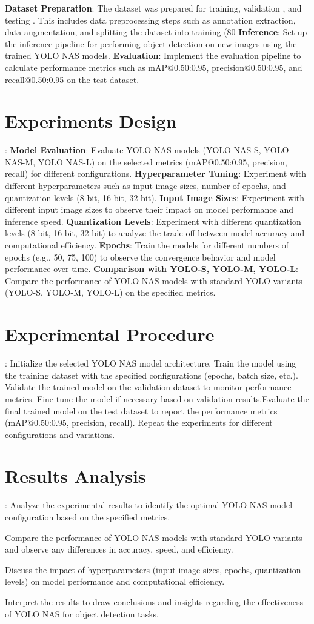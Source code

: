 \textbf{Dataset Preparation}: The dataset was prepared for training, validation , and testing . This includes data preprocessing steps such as annotation extraction, data augmentation, and splitting the dataset into training (80%
\textbf{Inference}: Set up the inference pipeline for performing object detection on new images using the trained YOLO NAS models.
\textbf{Evaluation}: Implement the evaluation pipeline to calculate performance metrics such as mAP@0.50:0.95, precision@0.50:0.95, and recall@0.50:0.95 on the test dataset.

\section{Experiments Design}:
\textbf{Model Evaluation}: Evaluate YOLO NAS models (YOLO NAS-S, YOLO NAS-M, YOLO NAS-L) on the selected metrics (mAP@0.50:0.95, precision, recall) for different configurations.
\textbf{Hyperparameter Tuning}: Experiment with different hyperparameters such as input image sizes, number of epochs, and quantization levels (8-bit, 16-bit, 32-bit).
\textbf{Input Image Sizes}: Experiment with different input image sizes to observe their impact on model performance and inference speed.
\textbf{Quantization Levels}: Experiment with different quantization levels (8-bit, 16-bit, 32-bit) to analyze the trade-off between model accuracy and computational efficiency.
\textbf{Epochs}: Train the models for different numbers of epochs (e.g., 50, 75, 100) to observe the convergence behavior and model performance over time.
\textbf{Comparison with YOLO-S, YOLO-M, YOLO-L}: Compare the performance of YOLO NAS models with standard YOLO variants (YOLO-S, YOLO-M, YOLO-L) on the specified metrics.

\section{Experimental Procedure}:
Initialize the selected YOLO NAS model architecture.
Train the model using the training dataset with the specified configurations (epochs, batch size, etc.). Validate the trained model on the validation dataset to monitor performance metrics. Fine-tune the model if necessary based on validation results.Evaluate the final trained model on the test dataset to report the performance metrics (mAP@0.50:0.95, precision, recall).
Repeat the experiments for different configurations and variations.

\section{Results Analysis}:
Analyze the experimental results to identify the optimal YOLO NAS model configuration based on the specified metrics.

Compare the performance of YOLO NAS models with standard YOLO variants and observe any differences in accuracy, speed, and efficiency.

Discuss the impact of hyperparameters (input image sizes, epochs, quantization levels) on model performance and computational efficiency.

Interpret the results to draw conclusions and insights regarding the effectiveness of YOLO NAS for object detection tasks.
